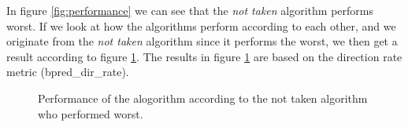 \documentclass[titlepage, a4paper]{article}
\begin{document}
In figure \ref{fig:performance} we can see that the \textit{not taken} algorithm performs worst. If we look at how the algorithms perform according to each other, and we originate from the \textit{not taken} algorithm since it performs the worst, we then get a result according to figure \ref{fig:comparative-evaluation}. The results in figure \ref{fig:comparative-evaluation} are based on the direction rate metric (bpred\_dir\_rate).

\begin{figure}[H]
	\centering
	\caption{Performance of the alogorithm according to the not taken algorithm who performed worst.}
	\label{fig:comparative-evaluation}
\end{figure}
\end{document}
